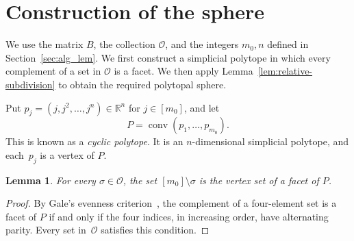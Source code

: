 \documentclass{amsart}
\theoremstyle{plain}
\newtheorem{lemma}[theorem]{Lemma}
\numberwithin{equation}{section}
\theoremstyle{remark}
\theoremstyle{definition}
\newcommand{\cO}{\mathcal O}
\DeclareMathOperator{\conv}{conv}
\newcommand{\R}{\mathbb R}
\begin{document}
\section{Construction of the sphere}\label{sec:construction}

We use the matrix $B$, the collection $\cO$, and the integers $m_0,n$ defined in Section~\ref{sec:alg_lem}.
We first construct a simplicial polytope in which every complement of a set in $\cO$ is a facet.
We then apply Lemma~\ref{lem:relative-subdivision} to obtain the required polytopal sphere.

Put $p_j=(j,j^2,\ldots,j^n)\in\R^n$ for $j \in [m_0]$, and let
$$
    P=\conv(p_1,\ldots,p_{m_0}).
$$
This is known as a \emph{cyclic polytope}.
It is an $n$-dimensional simplicial polytope, and each~$p_j$ is a vertex of $P$.
\begin{lemma}\label{lem:cyclic-facets}
    For every $\sigma \in \cO$, the set $[m_0]\setminus\sigma$ is the vertex set of a facet of $P$.
\end{lemma}
\begin{proof}
    By Gale's evenness criterion~\cite{Ziegler1995book}, the complement of a four-element set is a facet of $P$ if and only if the four indices, in increasing order, have alternating parity.
    Every set in~$\cO$ satisfies this condition.
\end{proof}
\end{document}
